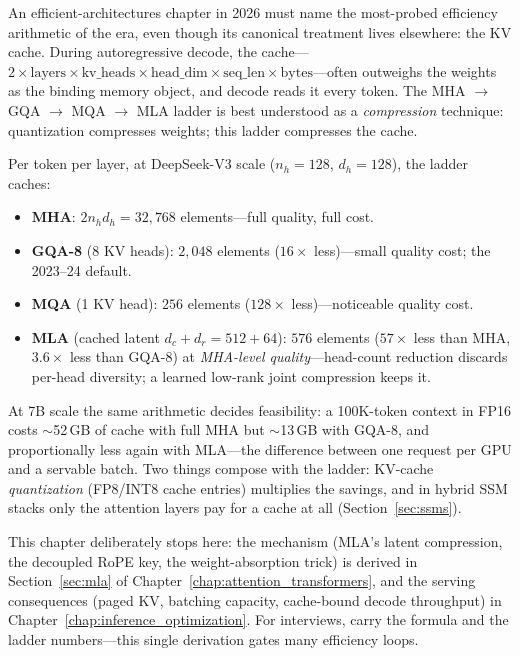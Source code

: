 An efficient-architectures chapter in 2026 must name the most-probed efficiency arithmetic of the era, even though its canonical treatment lives elsewhere: the KV cache. During autoregressive decode, the cache---$2 \times \text{layers} \times \text{kv\_heads} \times \text{head\_dim} \times \text{seq\_len} \times \text{bytes}$---often outweighs the weights as the binding memory object, and decode reads it every token. The MHA $\to$ GQA $\to$ MQA $\to$ MLA ladder is best understood as a \textit{compression} technique: quantization compresses weights; this ladder compresses the cache.

Per token per layer, at DeepSeek-V3 scale ($n_h = 128$, $d_h = 128$), the ladder caches:
\begin{itemize}
    \item \textbf{MHA}: $2 n_h d_h = 32{,}768$ elements---full quality, full cost.
    \item \textbf{GQA-8} (8 KV heads): $2{,}048$ elements ($16\times$ less)---small quality cost; the 2023--24 default.
    \item \textbf{MQA} (1 KV head): $256$ elements ($128\times$ less)---noticeable quality cost.
    \item \textbf{MLA} (cached latent $d_c + d_r = 512 + 64$): $576$ elements ($57\times$ less than MHA, $3.6\times$ less than GQA-8) at \textit{MHA-level quality}---head-count reduction discards per-head diversity; a learned low-rank joint compression keeps it.
\end{itemize}

At 7B scale the same arithmetic decides feasibility: a 100K-token context in FP16 costs $\sim$52\,GB of cache with full MHA but $\sim$13\,GB with GQA-8, and proportionally less again with MLA---the difference between one request per GPU and a servable batch. Two things compose with the ladder: KV-cache \textit{quantization} (FP8/INT8 cache entries) multiplies the savings, and in hybrid SSM stacks only the attention layers pay for a cache at all (Section~\ref{sec:ssms}).

This chapter deliberately stops here: the mechanism (MLA's latent compression, the decoupled RoPE key, the weight-absorption trick) is derived in Section~\ref{sec:mla} of Chapter~\ref{chap:attention_transformers}, and the serving consequences (paged KV, batching capacity, cache-bound decode throughput) in Chapter~\ref{chap:inference_optimization}. For interviews, carry the formula and the ladder numbers---this single derivation gates many efficiency loops.


